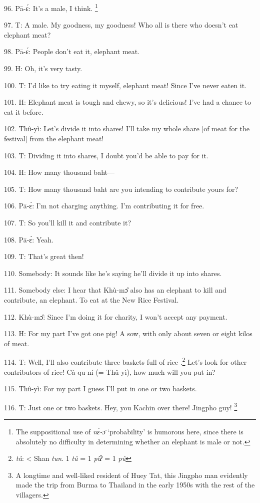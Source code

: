 96. Pā-ɛ́: It's a male, I think. \footnote{The suppositional use of \textit{nɛ̀-ɔ̄} `probability' is humorous here, since there is absolutely no difficulty in determining whether an elephant is male or not.}

97. T: A male.  My goodness, my goodness!  Who all is there who doesn't eat elephant
meat?

98. Pā-ɛ́: People don't eat it, elephant meat.

99. H: Oh, it's very tasty.

100. T: I'd like to try eating it myself, elephant meat!  Since I've never eaten
it.

101. H: Elephant meat is tough and chewy, so it's delicious!  I've had a chance
to eat it before.

102. Thû-yì: Let's divide it into shares!  I'll take my whole share [of meat
for the festival] from the elephant meat!

103. T: Dividing it into shares, I doubt you'd be able to pay for it.

104. H: How many thousand baht---

105. T: How many thousand baht are you intending to contribute yours for?

106. Pā-ɛ́: I'm not charging anything.  I'm contributing it for free.

107. T: So you'll kill it and contribute it?

108. Pā-ɛ́: Yeah.

109. T: That's great then!

110. Somebody: It sounds like he's saying he'll divide it up into shares.

111. Somebody else: I hear that Khù-mɔ̂ also has an elephant to kill and contribute,
an elephant.  To eat at the New Rice Festival.

112. Khù-mɔ̂: Since I'm doing it for charity, I won't accept any payment.

113. H: For my part I've got one pig!  A sow, with only about seven or eight kilos
of meat.

114. T: Well, I'll also contribute three baskets full of rice .\footnote{\textit{tû}: < Shan \textit{tun}.  1 \textit{tû} = 1 \textit{pîʔ} = 1 \textit{pû}}  Let's look
for other contributors of rice!  Cà-qu-ní (= Thû-yì), how much will you put
in?

115. Thû-yì: For my part I guess I'll put in one or two baskets.

116. T: Just one or two baskets.  Hey, you Kachin over there!  Jingpho guy! \footnote{A longtime and well-liked resident of Huey Tat, this Jingpho man evidently made the trip from Burma to Thailand in the early 1950s with the rest of the villagers.}

